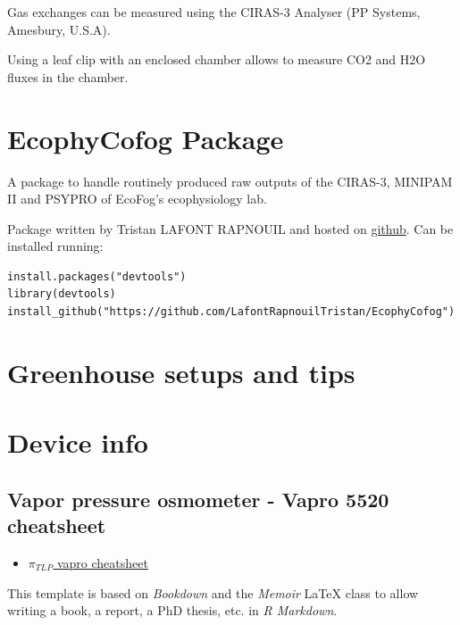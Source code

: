 \documentclass[
  12pt,
  american,
  a4paper,
  extrafontsizes,onecolumn,openright
  ]{memoir}
\providecommand{\tightlist}{%
  \setlength{\itemsep}{0pt}\setlength{\parskip}{0pt}}
\begin{document}
Gas exchanges can be measured using the CIRAS-3 Analyser (PP Systems, Amesbury, U.S.A).

Using a leaf clip with an enclosed chamber allows to measure CO2 and H2O fluxes in the chamber.

\hypertarget{ecophycofog-package}{%
\chapter{EcophyCofog Package}\label{ecophycofog-package}}

A package to handle routinely produced raw outputs of the CIRAS-3, MINIPAM II and PSYPRO of EcoFog's ecophysiology lab.

Package written by Tristan LAFONT RAPNOUIL and hosted on \href{https://github.com/LafontRapnouilTristan/EcophyCofog}{github}.
Can be installed running:

\begin{verbatim}
install.packages("devtools")
library(devtools)
install_github("https://github.com/LafontRapnouilTristan/EcophyCofog")
\end{verbatim}

\hypertarget{greenhouse-setups-and-tips}{%
\chapter{Greenhouse setups and tips}\label{greenhouse-setups-and-tips}}

\hypertarget{device-info}{%
\chapter{Device info}\label{device-info}}

\hypertarget{vapor-pressure-osmometer---vapro-5520-cheatsheet}{%
\section{Vapor pressure osmometer - Vapro 5520 cheatsheet}\label{vapor-pressure-osmometer---vapro-5520-cheatsheet}}

\begin{itemize}
\tightlist
\item
  \href{./document/machine/Vapro\%205520/Vapro_cheatsheet.pdf}{\textbf{\(\pi_{TLP}\)} vapro cheatsheet}
\end{itemize}

This template is based on \emph{Bookdown} and the \emph{Memoir} LaTeX class to allow writing a book, a report, a PhD thesis, etc. in \emph{R Markdown}.
\end{document}

